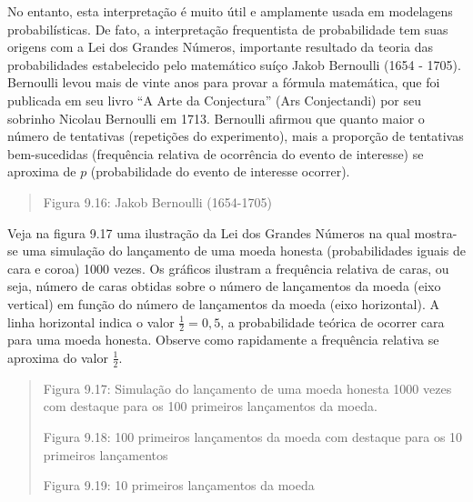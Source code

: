 No entanto, esta interpretação é muito útil e amplamente usada em modelagens probabilísticas. De fato, a interpretação frequentista de probabilidade tem suas origens com a Lei dos Grandes Números, importante resultado da teoria das probabilidades estabelecido pelo matemático suíço Jakob Bernoulli (1654 - 1705). Bernoulli levou mais de vinte anos para provar a fórmula matemática, que foi publicada em seu livro “A Arte da Conjectura” (Ars Conjectandi) por seu sobrinho Nicolau Bernoulli em 1713. Bernoulli afirmou que quanto maior o número de tentativas (repetições do experimento), mais a proporção de tentativas bem-sucedidas (frequência relativa de ocorrência do evento de interesse) se aproxima de \(p\) (probabilidade do evento de interesse ocorrer).
\begin{quote}

\begin{figure}[H]
\centering

\noindent{}
\end{figure}

Figura 9.16: Jakob Bernoulli (1654-1705)
\end{quote}

Veja na figura 9.17 uma ilustração da Lei dos Grandes Números na qual mostra-se uma simulação do lançamento de uma moeda honesta (probabilidades iguais de cara e coroa) 1000 vezes. Os gráficos  ilustram a frequência relativa de caras, ou seja, número de caras obtidas sobre o número de lançamentos da moeda (eixo vertical) em função do número de lançamentos da moeda (eixo horizontal). A linha horizontal indica o valor \(\frac{1}{2}=0,5\), a probabilidade teórica de ocorrer cara para uma moeda honesta. Observe como rapidamente a frequência relativa se aproxima do valor \(\frac{1}{2}\).
\begin{quote}

\begin{figure}[H]
\centering

\noindent{}
\end{figure}

Figura 9.17: Simulação do lançamento de uma moeda honesta 1000 vezes com destaque para  os 100 primeiros lançamentos da moeda.

\begin{figure}[H]
\centering

\noindent{}
\end{figure}

Figura 9.18: 100 primeiros lançamentos da moeda com destaque para os 10 primeiros lançamentos

\begin{figure}[H]
\centering

\noindent{}
\end{figure}

Figura 9.19: 10 primeiros lançamentos da moeda
\end{quote}

